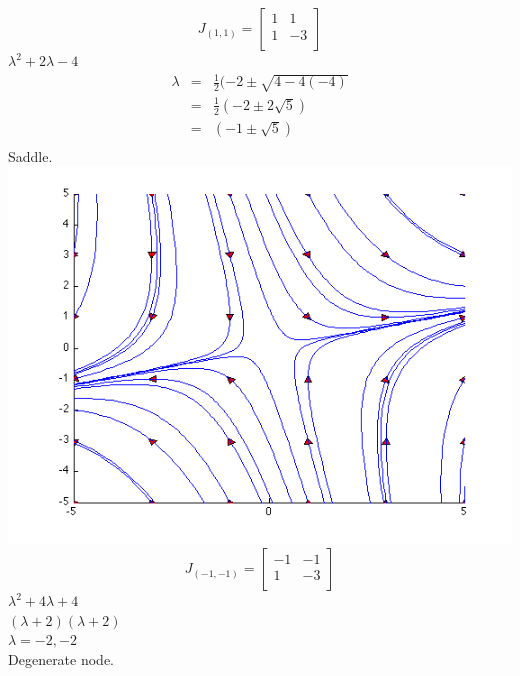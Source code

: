 \documentclass[12pt]{article}
\begin{document}
\begin{displaymath}
  J_{(1,1)} = \left[
  \begin{array}{cc}
    1 & 1\\
    1 & -3\\
    \end{array}
  \right]
\end{displaymath}
\newpage
\(\lambda^2 + 2\lambda - 4\)\\
\begin{eqnarray*}
  \lambda & = & \frac{1}{2}(-2 \pm\sqrt{4 - 4(-4)}\\
  & = & \frac{1}{2}(-2 \pm2\sqrt{5})\\
  & = & (-1 \pm\sqrt{5})\\
\end{eqnarray*}
Saddle.\\
\includegraphics[scale=.5]{6-3-6a.png}
\newpage
\begin{displaymath}
  J_{(-1,-1)} = \left[
  \begin{array}{cc}
    -1 & -1\\
    1 & -3\\
    \end{array}
  \right]
\end{displaymath}
\(\lambda^2 + 4\lambda + 4\)\\
\((\lambda+2)(\lambda+2)\)\\
\(\lambda=-2,-2\)\\
Degenerate node.\\
\end{document}
